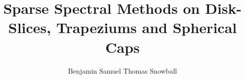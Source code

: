 \documentclass[a4paper,12pt,twoside]{report}
\begin{document}
\title{\LARGE {\bf Sparse Spectral Methods on Disk-Slices, Trapeziums and Spherical Caps}\\
 \vspace*{6mm}
}
\author{Benjamin Samuel Thomas Snowball}

\maketitle


\preface








%


\body










\newpage
{}
\printnomenclature


\newpage
{}
%

\end{document}
